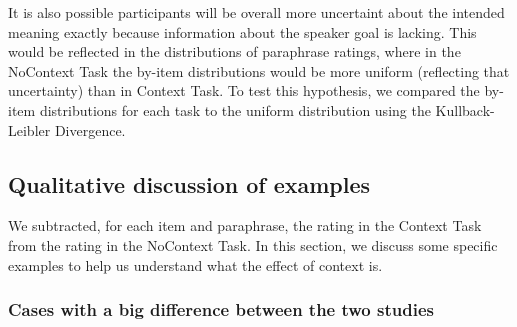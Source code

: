 \documentclass[12pt,letterpaper,table,svgnames,dvipsnames]{article}
\begin{document}
It is also possible participants will be overall more uncertaint about the intended meaning exactly because information about the speaker goal is lacking. This would be reflected in the distributions of paraphrase ratings, where in the NoContext Task the  by-item distributions would be more uniform (reflecting that uncertainty) than in Context Task. To test this hypothesis, we compared the by-item distributions for each task to the uniform distribution using the Kullback-Leibler Divergence.



\subsection{Qualitative discussion of examples}

We subtracted, for each item and paraphrase, the rating in the Context Task from the rating in the NoContext Task. In this section, we discuss some specific examples to help us understand what the effect of context is. 

\subsubsection{Cases with a big difference between the two studies}
\end{document}
